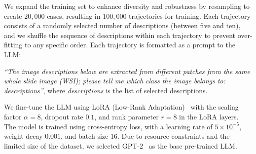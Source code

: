 We expand the training set to enhance diversity and robustness by resampling to create $20{,}000$ cases, resulting in $100{,}000$ trajectories for training. Each trajectory consists of a randomly selected number of descriptions (between five and ten), and we shuffle the sequence of descriptions within each trajectory to prevent over-fitting to any specific order. Each trajectory is formatted as a prompt to the LLM:

\textit{“The image descriptions below are extracted from different patches from the same whole slide image (WSI); please tell me which class the image belongs to: {descriptions}”},
\noindent
where \textit{{descriptions}} is the list of selected descriptions.

We fine-tune the LLM using LoRA (Low-Rank Adaptation)~\cite{hu2021loralowrankadaptationlarge} with the scaling factor $\alpha=8$, dropout rate $0.1$, and rank parameter $r=8$ in the LoRA layers. The model is trained using cross-entropy loss, with a learning rate of $5 \times 10^{-5}$, weight decay $0.001$, and batch size $16$. Due to resource constraints and the limited size of the dataset, we selected GPT-2~\cite{radford2019language} as the base pre-trained LLM.




